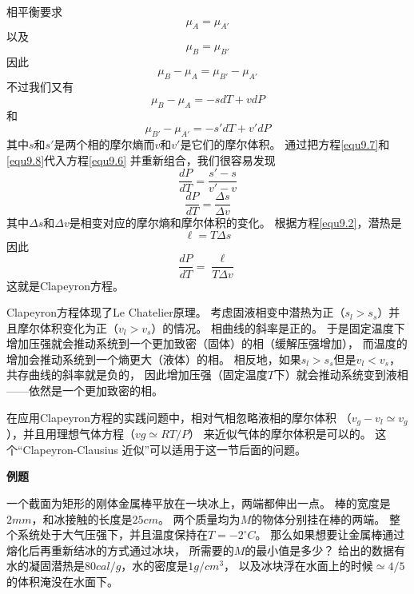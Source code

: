 相平衡要求
\begin{equation}
\label{equ9.4}
\mu_A=\mu_{A'}
\end{equation}
以及
\begin{equation}
\label{equ9.5}
\mu_B=\mu_{B'}
\end{equation}
因此
\begin{equation}
\label{equ9.6}
\mu_B-\mu_A=\mu_{B'}-\mu_{A'}
\end{equation}
不过我们又有
\begin{equation}
\label{equ9.7}
\mu_B-\mu_A=-sdT+vdP
\end{equation}
和
\begin{equation}
\label{equ9.8}
\mu_{B'}-\mu_{A'}=-s'dT+v'dP
\end{equation}
其中$s$和$s'$是两个相的摩尔熵而$v$和$v'$是它们的摩尔体积。
通过把方程\eqref{equ9.7}和\eqref{equ9.8}代入方程\eqref{equ9.6}
并重新组合，我们很容易发现
\begin{equation}
\label{equ9.9}
\frac{dP}{dT}=\frac{s'-s}{v'-v}
\end{equation}
\begin{equation}
\label{equ9.10}
\frac{dP}{dT}=\frac{\Delta s}{\Delta v}
\end{equation}
其中$\Delta s$和$\Delta v$是相变对应的摩尔熵和摩尔体积的变化。
根据方程\eqref{equ9.2}，潜热是
\begin{equation}
\label{equ9.11}
\ell=T\Delta s
\end{equation}
因此
\begin{equation}
\label{equ9.12}
\frac{dP}{dT}=\frac{\ell}{T\Delta v}
\end{equation}
这就是Clapeyron方程。

Clapeyron方程体现了Le Chatelier原理。
考虑固液相变中潜热为正（$s_l>s_s$）并且摩尔体积变化为正（$v_l>v_s$）的情况。
相曲线的斜率是正的。
于是固定温度下增加压强就会推动系统到一个更加致密（固体）的相（缓解压强增加），
而温度的增加会推动系统到一个熵更大（液体）的相。
相反地，如果$s_l>s_s$但是$v_l<v_s$，共存曲线的斜率就是负的，
因此增加压强（固定温度$T$下）就会推动系统变到液相——依然是一个更加致密的相。

在应用Clapeyron方程的实践问题中，相对气相忽略液相的摩尔体积
（$v_g-v_l\simeq v_g$），并且用理想气体方程（$vg\simeq RT/P$）
来近似气体的摩尔体积是可以的。
这个“Clapeyron-Clausius 近似”可以适用于这一节后面的问题。

{\bf 例题}

一个截面为矩形的刚体金属棒平放在一块冰上，两端都伸出一点。
棒的宽度是$2mm$，和冰接触的长度是$25cm$。
两个质量均为$M$的物体分别挂在棒的两端。
整个系统处于大气压强下，并且温度保持在$T=-2^\circ C$。
那么如果想要让金属棒通过熔化后再重新结冰的方式通过冰块，
所需要的$M$的最小值是多少？
给出的数据有水的凝固潜热是$80cal/g$，水的密度是$1g/cm^3$，
以及冰块浮在水面上的时候$\simeq 4/5$的体积淹没在水面下。

